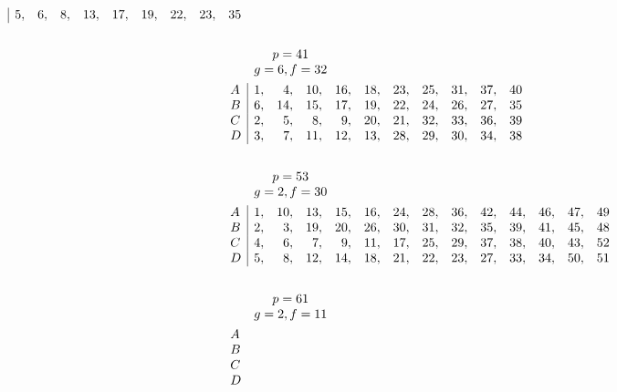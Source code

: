 \documentclass{book}
\theoremstyle{plain}
\theoremstyle{remark}
\begin{document}
\begin{align*}
\begin{array}{|rrrrrrrrr}
5,&6,&8,& 13,& 17,&19,&22,& 23,&35
\end{array} \\
\hspace{1mm} \\
& \begin{array}{c} p=41 \\  g=6, f=32 \end{array} \\
\begin{array}{l} A \\ B \\ C \\D \end{array} & 
\begin{array}{|rrrrrrrrrr} 
1,&4,&10,&16,&18,&23,&25,&31,&37,&40 \\ 
6,& 14,&15,&17,&19,&22,&24,&26,&27,&35 \\ 
2,& 5,& 8,&9,&20,&21,&32,&33,&36,&39 \\ 
3,&7,&11,& 12,& 13,&28,&29,& 30,&34,&38
\end{array}  \\
\hspace{1mm} \\
& \begin{array}{c} p=53 \\  g=2, f=30 \end{array} \\
\begin{array}{l} A \\ B \\ C \\D \end{array} & 
\begin{array}{|rrrrrrrrrrrrr} 
1,&10,&13,&15,&16,&24,&28,&36,&42,&44,&46,&47,&49 \\ 
2,&3,& 19,&20,&26,&30,&31,&32,&35,&39,&41,&45,&48 \\ 
4,& 6,& 7,&9,&11,&17,&25,&29,&37,&38,&40,&43,&52 \\ 
5,&8,&12,&14,&18,&21,&22,& 23,&27,&33,&34,&50,&51
\end{array} \\
\hspace{1mm} \\
& \begin{array}{c} p=61 \\  g=2, f=11 \end{array} \\
\begin{array}{l} A \\ B \\ C \\D \end{array} & 

\end{align*}
\end{document}
